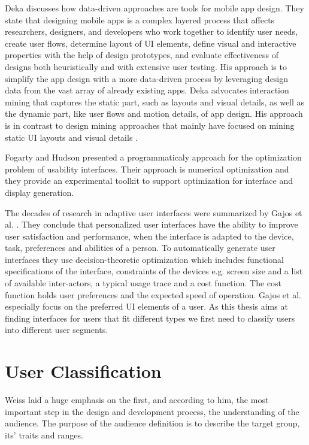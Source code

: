 Deka \cite{deka2016data} discusses how data-driven approaches are tools for mobile app design. They state that designing mobile apps is a complex layered process that affects researchers, designers, and developers who work together to identify user needs, create user flows, determine layout of UI elements, define visual and interactive properties with the help of design prototypes, and evaluate effectiveness of designs both heuristically and with extensive user testing. His approach is to simplify the app design with a more data-driven process by leveraging design data from the vast array of already existing apps. Deka advocates interaction mining that captures the static part, such as layouts and visual details, as well as the dynamic part, like user flows and motion details, of app design. His approach is in contrast to design mining approaches that mainly have focused on mining static UI layouts and visual details \cite{kumar2013webzeitgeist, alharbi2015collect}.

Fogarty and Hudson \cite{fogarty2003gadget} presented a programmaticaly approach for the optimization problem of usability interfaces. Their approach is numerical optimization and they provide an experimental toolkit to support optimization for interface and display generation.

The decades of research in adaptive user interfaces were summarized by Gajos et al. \cite{gajos2008decision}. They conclude that personalized user interfaces have the ability to improve user satisfaction and performance, when the interface is adapted to the device, task, preferences and abilities of a person. To automatically generate user interfaces they use decision-theoretic optimization which includes functional specifications of the interface, constraints of the devices e.g. screen size and a list of available inter-actors, a typical usage trace and a cost function. The cost function holds user preferences and the expected speed of operation. Gajos et al. especially focus on the preferred UI elements of a user. As this thesis aims at finding interfaces for users that fit different types we first need to classify users into different user segments.

\section{User Classification}

Weiss \cite{weiss2003handheld} laid a huge emphasis on the first, and according to him, the most important step in the design and development process, the understanding of the audience. The purpose of the audience definition is to describe the target group, its' traits and ranges.

